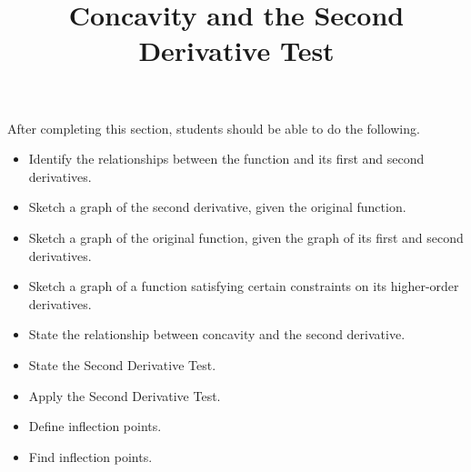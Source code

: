 \documentclass{ximera}
\title{Concavity and the Second Derivative Test}
\begin{document}
\begin{abstract}
\end{abstract}

\maketitle

\begin{sectionOutcomes}

After completing this section, students should be able to do the following.


\begin{itemize}
\item Identify the relationships between the function and its first and second derivatives.
\item Sketch a graph of the second derivative, given the original function.
\item Sketch a graph of the original function, given the graph of its first and second derivatives.
\item Sketch a graph of a function satisfying certain constraints on its higher-order derivatives.
\item State the relationship between concavity and the second derivative.
\item State the Second Derivative Test.
\item Apply the Second Derivative Test.
\item Define inflection points.
\item Find inflection points.
\end{itemize}
\end{sectionOutcomes}
\end{document}
